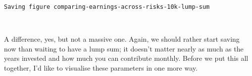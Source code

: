 \documentclass[11pt]{article}
\begin{document}
    \begin{Verbatim}[commandchars=\\\{\}]
Saving figure comparing-earnings-across-risks-10k-lump-sum

    \end{Verbatim}

    \begin{center}
    \end{center}
    { \hspace*{\fill} \\}
    
    A difference, yes, but not a massive one. Again, we should rather start
saving now than waiting to have a lump sum; it doesn't matter nearly as
much as the years invested and how much you can contribute monthly.
Before we put this all together, I'd like to visualise these parameters
in one more way.
\end{document}
